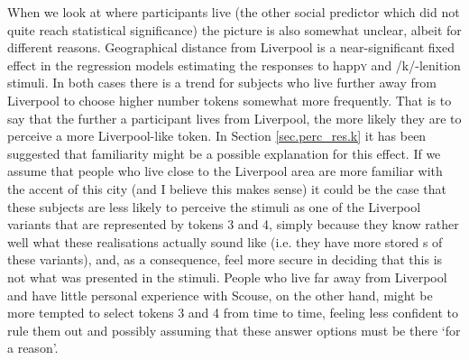 When we look at where participants live (the other social predictor which did not quite reach statistical significance) the picture is also somewhat unclear, albeit for different reasons.
Geographical distance from Liverpool is a near-significant fixed effect in the regression models estimating the responses to happ\textsc{y} and /k/-lenition stimuli.
In both cases there is a trend for subjects who live further away from Liverpool to choose higher number tokens somewhat more frequently.
That is to say that the further a participant lives from Liverpool, the more likely they are to perceive a more Liverpool-like token.
In Section \ref{sec.perc_res.k} it has been suggested that familiarity might be a possible explanation for this effect.
If we assume that people who live close to the Liverpool area are more familiar with the accent of this city (and I believe this makes sense) it could be the case that these subjects are less likely to perceive the stimuli as one of the Liverpool variants that are represented by tokens 3 and 4, simply because they know rather well what these realisations actually sound like (i.e. they have more stored s of these variants), and, as a consequence, feel more secure in deciding that this is not what was presented in the stimuli.
People who live far away from Liverpool and have little personal experience with Scouse, on the other hand, might be more tempted to select tokens 3 and 4 from time to time, feeling less confident to rule them out and possibly assuming that these answer options must be there `for a reason'.

